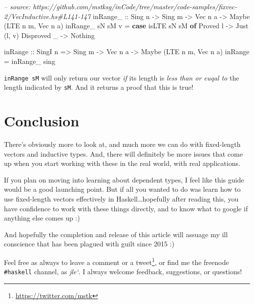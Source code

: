 \documentclass[]{article}
\newenvironment{Shaded}{}{}
\newcommand{\KeywordTok}[1]{\textcolor[rgb]{0.00,0.44,0.13}{\textbf{#1}}}
\newcommand{\DataTypeTok}[1]{\textcolor[rgb]{0.56,0.13,0.00}{#1}}
\newcommand{\CommentTok}[1]{\textcolor[rgb]{0.38,0.63,0.69}{\textit{#1}}}
\newcommand{\OtherTok}[1]{\textcolor[rgb]{0.00,0.44,0.13}{#1}}
\newcommand{\FunctionTok}[1]{\textcolor[rgb]{0.02,0.16,0.49}{#1}}
\newcommand{\NormalTok}[1]{#1}
\renewcommand{\href}[2]{#2\footnote{\url{#1}}}
\begin{document}
\begin{Shaded}
\begin{Highlighting}[]
\CommentTok{-- source: https://github.com/mstksg/inCode/tree/master/code-samples/fixvec-2/VecInductive.hs#L141-147}
\OtherTok{inRange_ ::} \DataTypeTok{Sing}\NormalTok{ n }\OtherTok{->} \DataTypeTok{Sing}\NormalTok{ m }\OtherTok{->} \DataTypeTok{Vec}\NormalTok{ n a }\OtherTok{->} \DataTypeTok{Maybe}\NormalTok{ (}\DataTypeTok{LTE}\NormalTok{ n m, }\DataTypeTok{Vec}\NormalTok{ n a)}
\NormalTok{inRange_ sN sM v }\FunctionTok{=} \KeywordTok{case}\NormalTok{ isLTE sN sM }\KeywordTok{of}
    \DataTypeTok{Proved}\NormalTok{ l    }\OtherTok{->} \DataTypeTok{Just}\NormalTok{ (l, v)}
    \DataTypeTok{Disproved}\NormalTok{ _ }\OtherTok{->} \DataTypeTok{Nothing}


\NormalTok{inRange}\OtherTok{ ::} \DataTypeTok{SingI}\NormalTok{ n }\OtherTok{=>} \DataTypeTok{Sing}\NormalTok{ m }\OtherTok{->} \DataTypeTok{Vec}\NormalTok{ n a }\OtherTok{->} \DataTypeTok{Maybe}\NormalTok{ (}\DataTypeTok{LTE}\NormalTok{ n m, }\DataTypeTok{Vec}\NormalTok{ n a)}
\NormalTok{inRange }\FunctionTok{=}\NormalTok{ inRange_ sing}
\end{Highlighting}
\end{Shaded}

\texttt{inRange\ sM} will only return our vector \emph{if} its length is
\emph{less than or euqal to} the length indicated by \texttt{sM}. And it returns
a proof that this is true!

\section{Conclusion}\label{conclusion}

There's obviously more to look at, and much more we can do with fixed-length
vectors and inductive types. And, there will definitely be more issues that come
up when you start working with these in the real world, with real applications.

If you plan on moving into learning about dependent types, I feel like this
guide would be a good launching point. But if all you wanted to do was learn how
to use fixed-length vectors effectively in Haskell\ldots{}hopefully after
reading this, you have confidence to work with these things directly, and to
know what to google if anything else comes up :)

And hopefully the completion and release of this article will assuage my ill
conscience that has been plagued with guilt since 2015 :)

Feel free as always to leave a comment or a
\href{https://twitter.com/mstk}{tweet}, or find me the freenode
\texttt{\#haskell} channel, as \emph{jle`}. I always welcome feedback,
suggestions, or questions!
\end{document}
